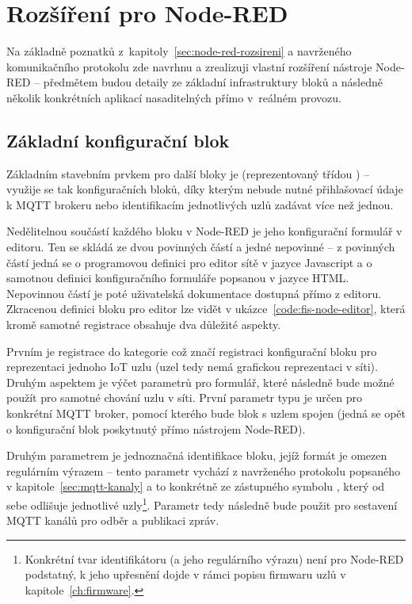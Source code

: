 \chapter{Rozšíření pro Node-RED}
\label{ch:rozsireni}

Na základně poznatků z~kapitoly~\ref{sec:node-red-rozsireni} a navrženého komunikačního protokolu zde navrhnu a
zrealizuji vlastní rozšíření nástroje Node-RED -- předmětem budou detaily ze základní infrastruktury bloků a
následně několik konkrétních
aplikací nasaditelných přímo v~reálném provozu.

\section{Základní konfigurační blok}\label{sec:zakladni-konfiguracni-blok}
Základním stavebním prvkem pro další bloky je  (reprezentovaný třídou ) -- využije se tak
konfiguračních bloků, díky kterým nebude nutné přihlašovací údaje k MQTT brokeru nebo identifikacím jednotlivých
uzlů zadávat více než jednou.

Nedělitelnou součástí každého bloku v Node-RED je jeho konfigurační formulář v editoru.
Ten se skládá ze dvou povinných částí a jedné nepovinné -- z povinných částí jedná se o programovou definici pro editor
sítě v jazyce Javascript a o samotnou definici konfiguračního formuláře popsanou v jazyce HTML.
Nepovinnou částí je poté uživatelská dokumentace dostupná přímo z editoru.
Zkracenou definici bloku pro editor lze vidět v ukázce~\ref{code:fis-node-editor}, která kromě samotné registrace
obsahuje dva důležité aspekty.

Prvním je registrace do kategorie  což značí registraci konfigurační bloku pro reprezentaci jednoho IoT
uzlu (uzel tedy nemá grafickou reprezentaci v síti).
Druhým aspektem je výčet parametrů pro formulář, které následně bude možné použít pro samotné chování uzlu v síti.
První parametr typu  je určen pro konkrétní MQTT broker, pomocí kterého bude blok s uzlem spojen
(jedná se opět o konfigurační blok poskytnutý přímo nástrojem Node-RED).

Druhým parametrem je jednoznačná identifikace bloku, jejíž formát je omezen regulárním výrazem -- tento
parametr vychází z navrženého protokolu popsaného v kapitole~\ref{sec:mqtt-kanaly} a to
konkrétně ze zástupného symbolu , který od sebe odlišuje jednotlivé uzly\footnote{Konkrétní tvar
identifikátoru (a jeho regulárního výrazu) není pro Node-RED podstatný, k jeho upřesnění dojde v rámci popisu firmwaru
uzlů v kapitole~\ref{ch:firmware}.}.
Parametr  tedy následně bude použit pro sestavení MQTT kanálů pro odběr a publikaci zpráv.

